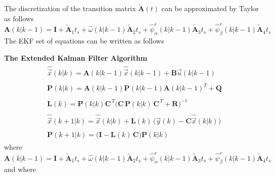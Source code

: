 \documentclass[11pt,a4paper,oneside]{book}
\numberwithin{equation}{section}
\theoremstyle{it}
\theoremstyle{definition}
\begin{document}
The discretization of the transition matrix $\tilde{\mathbf{A}}(t)$ can be 
approximated by Taylor as follows
\begin{equation}\label{pmsm_problem_1_eq_12}
	{\mathbf{A}}(k|k-1) = \mathbf{I} + \tilde{\mathbf{A}}_1t_s + 
	\hat{\omega}(k|k-1) \tilde{\mathbf{A}}_2t_s + \hat{\psi}_\alpha^r(k|k-1) 
	\tilde{\mathbf{A}}_3t_s + \hat{\psi}_\beta^r(k|k-1) \tilde{\mathbf{A}}_4t_s
\end{equation}
The EKF set of equations can be written as follows
\begin{mybox}
	\noindent\textbf{The Extended Kalman Filter Algorithm}
	\begin{align}\label{pmsm_problem_1_eq_13}
		\begin{split}
			&\hat{\vec{x}}\left(k|k\right) = \mathbf{A}(k|k-1) 
			\hat{\vec{x}}\left(k|k-1\right) + \mathbf{B} 
			\vec{u}\left(k|k-1\right)
		\end{split} \\[8pt]
		\begin{split}
			&\mathbf{P}\left(k|k\right) = 
			\mathbf{A}(k|k-1)\mathbf{P}\left(k|k-1\right) \mathbf{A}(k|k-1)^T + 
			\mathbf{Q} 
		\end{split}\\[8pt]
		\begin{split}
			&\mathbf{L}(k) = \mathbf{P}(k|k)\mathbf{C}^{\,T} 
			\Big(\mathbf{C}\,\mathbf{P}(k|k)\,\mathbf{C}^{\,T} 
			+\mathbf{R}\Big)^{-1}
		\end{split}\\[8pt]
		\begin{split}
			&\hat{\vec{x}}\left(k+1|k\right) = \hat{\vec{x}}\left(k|k\right) + 
			\mathbf{L}(k)\, \Big(\vec{y}(k) - 
			\mathbf{C}\hat{\vec{x}}\left(k|k\right)\Big)
		\end{split}\\[8pt]
		\begin{split}
			&\mathbf{P}\left(k+1|k\right) = 
			\Big(\mathbf{I}-\mathbf{L}(k)\,\mathbf{C} \Big) 
			\mathbf{P}\left(k|k\right) 
		\end{split}
	\end{align} 
	where
	\begin{equation}\label{pmsm_problem_1_eq_14}
		{\mathbf{A}}(k|k-1) = \mathbf{I} + \tilde{\mathbf{A}}_1t_s + 
		\hat{\omega}(k|k-1) \tilde{\mathbf{A}}_2t_s + \hat{\psi}_\alpha^r(k|k-1) 
		\tilde{\mathbf{A}}_3t_s + \hat{\psi}_\beta^r(k|k-1) \tilde{\mathbf{A}}_4t_s
	\end{equation}
	and where
	\begin{equation}\label{pmsm_problem_1_eq_15}

\end{equation}
\end{mybox}
\end{document}
